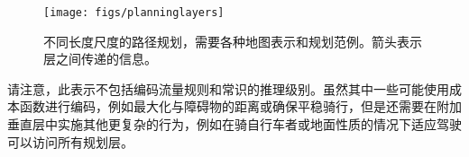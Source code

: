 \begin{figure}
\centering
\texttt{[image: figs/planninglayers]}
\caption{不同长度尺度的路径规划，需要各种地图表示和规划范例。箭头表示层之间传递的信息。\label{fig:planninglayers}}
\end{figure}


请注意，此表示不包括编码流量规则和常识的推理级别。虽然其中一些可能使用成本函数进行编码，例如最大化与障碍物的距离或确保平稳骑行，但是还需要在附加垂直层中实施其他更复杂的行为，例如在骑自行车者或地面性质的情况下适应驾驶 可以访问所有规划层。




